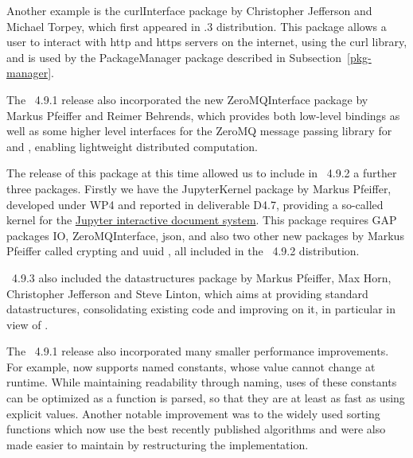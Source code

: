 Another example is the {\sf curlInterface} package \cite{curlInterface}
by Christopher Jefferson and Michael Torpey, which first appeared
in .3 distribution.  This package allows a user to interact 
with http and https servers on the internet, using the {\sf curl} library, 
and is used by the {\sf PackageManager} package
\cite{PackageManager} described in Subsection~\ref{pkg-manager}.

The \GAP~4.9.1 release also incorporated the new {\sf ZeroMQInterface}
package
\cite{ZeroMQInterface} by Markus Pfeiffer and Reimer Behrends, which
provides both low-level bindings as well as some higher level interfaces
for the {\sf ZeroMQ} message passing library for \GAP and \HPCGAP, 
enabling lightweight distributed computation. 


The release of this package at this time allowed us to include in \GAP~4.9.2 a
further three packages.  Firstly we have the {\sf JupyterKernel} package \cite{JupyterKernel} 
by Markus Pfeiffer, developed under WP4 and reported in deliverable D4.7,
providing a so-called kernel for the
\href{https://jupyter.org/}{Jupyter interactive document system}. This package
requires GAP packages {\sf IO}, {\sf ZeroMQInterface}, {\sf json},
and also two other new packages by Markus Pfeiffer called
{\sf crypting} and {\sf uuid} \cite{crypting,uuid}, all included 
in the \GAP~4.9.2 distribution.

\GAP~4.9.3 also included the {\sf datastructures} package \cite{datastructures}
by Markus Pfeiffer, Max Horn, Christopher Jefferson and Steve Linton, which aims 
at providing standard datastructures, consolidating existing code and improving 
on it, in particular in view of \HPCGAP.

The \GAP~4.9.1 release also incorporated many smaller performance improvements. For example,
\GAP now supports named constants, whose value cannot change 
at runtime. While maintaining readability through naming, uses of
these constants can be optimized as a function is parsed, so that they
are at least as fast as using explicit values. Another notable improvement was
to the widely used  sorting functions which now use the best
recently published algorithms and were also made easier to maintain by
restructuring the implementation.

